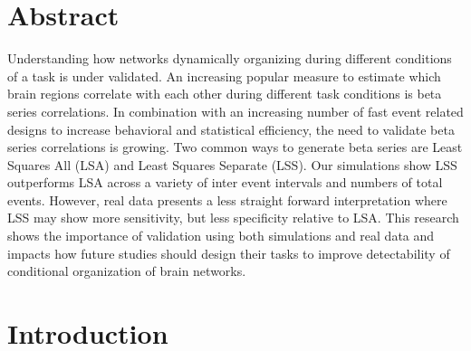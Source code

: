 \documentclass[10pt,letterpaper]{article}
\begin{document}
\section*{Abstract}
Understanding how networks dynamically organizing during different conditions
of a task is under validated.
An increasing popular measure to estimate which brain regions correlate with
each other during different task conditions is beta series correlations.
In combination with an increasing number of fast event related designs to
increase behavioral and statistical efficiency, the need to validate
beta series correlations is growing.
Two common ways to generate beta series are Least Squares All (LSA) and
Least Squares Separate (LSS).
Our simulations show LSS outperforms LSA across a variety of inter event
intervals and numbers of total events.
However, real data presents a less straight forward interpretation
where LSS may show more sensitivity, but less specificity relative to
LSA.
This research shows the importance of validation using both simulations
and real data and impacts how future studies should design their tasks
to improve detectability of conditional organization of brain networks.



\linenumbers

\section*{Introduction}
\label{intro}
\end{document}

